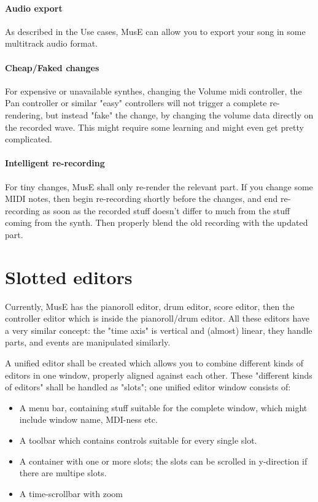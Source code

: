 \documentclass[a4paper]{report}
\begin{document}
\paragraph{Audio export}
As described in the Use cases, MusE can allow you to export your song
in some multitrack audio format.

\paragraph{Cheap/Faked changes}
For expensive or unavailable synthes, changing the Volume midi controller,
the Pan controller or similar "easy" controllers will not trigger a
complete re-rendering, but instead "fake" the change, by changing
the volume data directly on the recorded wave. This might require some
learning and might even get pretty complicated.

\paragraph{Intelligent re-recording}
For tiny changes, MusE shall only re-render the relevant part. If you
change some MIDI notes, then begin re-recording shortly before the
changes, and end re-recording as soon as the recorded stuff doesn't
differ to much from the stuff coming from the synth. Then properly
blend the old recording with the updated part.



\section{Slotted editors}
Currently, MusE has the pianoroll editor, drum editor, score editor,
then the controller editor which is inside the pianoroll/drum editor.
All these editors have a very similar concept: the "time axis" is 
vertical and (almost) linear, they handle parts, and events are 
manipulated similarly.

A unified editor shall be created which allows you to combine different
kinds of editors in one window, properly aligned against each other.
These "different kinds of editors" shall be handled as "slots"; one
unified editor window consists of:
\begin{itemize}
\item A menu bar, containing stuff suitable for the complete window,
      which might include window name, MDI-ness etc.
\item A toolbar which contains controls suitable for every single slot.
\item A container with one or more slots; the slots can be scrolled in
      y-direction if there are multipe slots.
\item A time-scrollbar with zoom
\end{itemize}
\end{document}
